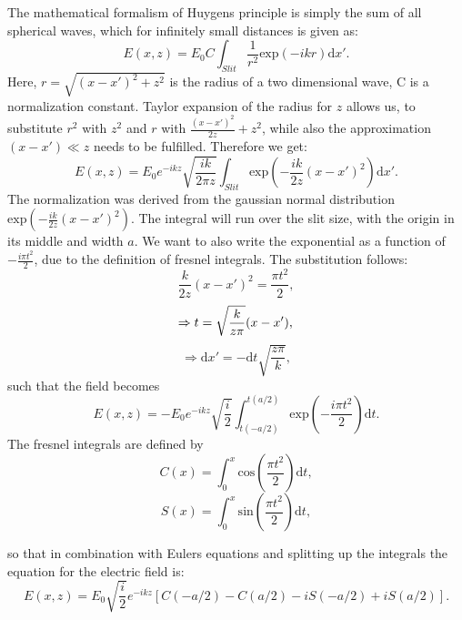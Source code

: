 The mathematical formalism of Huygens principle is simply the sum of all spherical waves, which for infinitely small distances is given as\cite{Steck2012}:
\begin{equation}
E(x,z) = E_0 C \int_{Slit} \frac{1}{r^2} \mathrm{exp}(-ikr)\mathrm{d}x'.
\end{equation}
Here, $r=\sqrt{(x-x')^2 + z^2}$ is the radius of a two dimensional wave, C is a normalization constant.
Taylor expansion of the radius for $z$ allows us, to substitute $r^2$ with $z^2$ and $r$ with $\frac{(x-x')^2}{2z} + z^2$, while also the approximation $(x-x') \ll z$ needs to be fulfilled. Therefore we get:
\begin{equation}
E(x,z) = E_0 e^{-ikz}\sqrt{\frac{ik}{2\pi z}}\int_{Slit} \mathrm{exp}\left( -\frac{ik}{2z}(x-x')^2\right) \mathrm{d}x'.
\end{equation}
The normalization was derived from the gaussian normal distribution $\mathrm{exp}( -\frac{ik}{2z}(x-x')^2)$. The integral will run over the slit size, with the origin in its middle and width $a$.
We want to also write the exponential as a function of $-\frac{i\pi t^2}{2}$, due to the definition of fresnel integrals. The substitution follows:
\begin{equation}
\frac{k}{2z}(x-x')^2 = \frac{\pi t^2}{2},
\end{equation}
\begin{equation}
\Rightarrow t = \sqrt{\frac{k}{z\pi}}(x-x'), \\
\end{equation}
\begin{equation}
\Rightarrow \mathrm{d}x' = -\mathrm{d}t \sqrt{\frac{z\pi}{k}},
\end{equation}
such that the field becomes
\begin{equation}
E(x,z) = -E_0 e^{-ikz}\sqrt{\frac{i}{2}}\int_{t(-a/2)}^{t(a/2)} \mathrm{exp}\left( -\frac{i\pi t^2}{2}\right) \mathrm{d}t.
\end{equation}
The fresnel integrals are defined by
\begin{equation}
C(x) = \int_0^x \mathrm{cos}\left(\frac{\pi t^2}{2}\right)\mathrm{d}t,
\end{equation}
\begin{equation}
S(x) = \int_0^x \mathrm{sin}\left(\frac{\pi t^2}{2}\right)\mathrm{d}t,
\end{equation}

so that in combination with Eulers equations and splitting up the integrals the equation for the electric field is:
\begin{equation}
E(x,z) = E_0 \sqrt{\frac{i}{2}} e^{-ikz} \left [ C(-a/2) - C(a/2) - iS(-a/2) + iS(a/2) \right ].
\end{equation}

